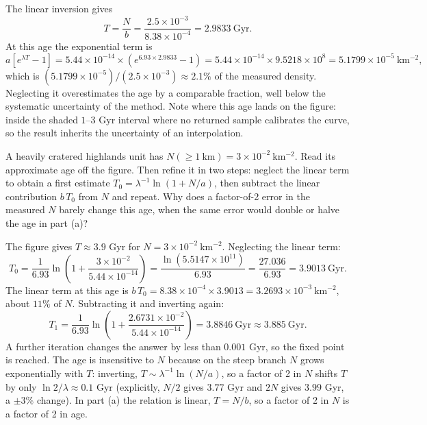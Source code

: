 \begin{solution}
The linear inversion gives
\[
T = \frac{N}{b} = \frac{2.5 \times 10^{-3}}{8.38 \times 10^{-4}} = 2.9833\ \mathrm{Gyr}.
\]
At this age the exponential term is
\[
a\left[e^{\lambda T} - 1\right] = 5.44 \times 10^{-14} \times \left(e^{6.93 \times 2.9833} - 1\right)
= 5.44 \times 10^{-14} \times 9.5218 \times 10^{8} = 5.1799 \times 10^{-5}\ \mathrm{km^{-2}},
\]
which is $(5.1799 \times 10^{-5})/(2.5 \times 10^{-3}) \approx 2.1\%$ of the measured density.
Neglecting it overestimates the age by a comparable fraction, well below the systematic uncertainty of the method.
Note where this age lands on the figure: inside the shaded $1$--$3$ Gyr interval where no returned sample calibrates the curve,
so the result inherits the uncertainty of an interpolation.
\end{solution}

\parti A heavily cratered highlands unit has $N(\geq 1\ \mathrm{km}) = 3 \times 10^{-2}\ \mathrm{km^{-2}}$.
Read its approximate age off the figure.
Then refine it in two steps: neglect the linear term to obtain a first estimate
$T_0 = \lambda^{-1}\ln\!\left(1 + N/a\right)$,
then subtract the linear contribution $b\,T_0$ from $N$ and repeat.
Why does a factor-of-2 error in the measured $N$ barely change this age,
when the same error would double or halve the age in part (a)?

\begin{solution}
The figure gives $T \approx 3.9$ Gyr for $N = 3 \times 10^{-2}\ \mathrm{km^{-2}}$.
Neglecting the linear term:
\[
T_0 = \frac{1}{6.93}\ln\!\left(1 + \frac{3 \times 10^{-2}}{5.44 \times 10^{-14}}\right)
= \frac{\ln\!\left(5.5147 \times 10^{11}\right)}{6.93} = \frac{27.036}{6.93} = 3.9013\ \mathrm{Gyr}.
\]
The linear term at this age is $b\,T_0 = 8.38 \times 10^{-4} \times 3.9013 = 3.2693 \times 10^{-3}\ \mathrm{km^{-2}}$,
about $11\%$ of $N$. Subtracting it and inverting again:
\[
T_1 = \frac{1}{6.93}\ln\!\left(1 + \frac{2.6731 \times 10^{-2}}{5.44 \times 10^{-14}}\right) = 3.8846\ \mathrm{Gyr} \approx 3.885\ \mathrm{Gyr}.
\]
A further iteration changes the answer by less than $0.001$ Gyr, so the fixed point is reached.
The age is insensitive to $N$ because on the steep branch $N$ grows exponentially with $T$:
inverting, $T \sim \lambda^{-1}\ln(N/a)$, so a factor of 2 in $N$ shifts $T$ by only $\ln 2 / \lambda \approx 0.1$ Gyr
(explicitly, $N/2$ gives $3.77$ Gyr and $2N$ gives $3.99$ Gyr, a $\pm 3\%$ change).
In part (a) the relation is linear, $T = N/b$, so a factor of 2 in $N$ is a factor of 2 in age.
\end{solution}

